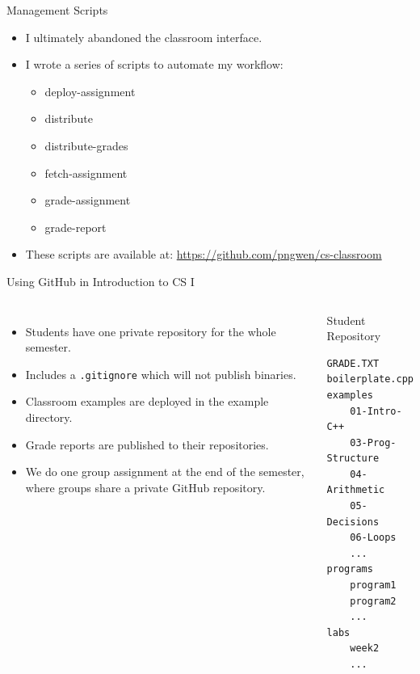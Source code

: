 \documentclass[handout]{beamer}
\begin{document}
\begin{frame}{Management Scripts}
    \begin{itemize}
        \item I ultimately abandoned the classroom interface.
        \item I wrote a series of scripts to automate my workflow:
        \begin{itemize}
            \item deploy-assignment
            \item distribute
            \item distribute-grades
            \item fetch-assignment
            \item grade-assignment
            \item grade-report
        \end{itemize}
        \item These scripts are available at: 
        \newline\url{https://github.com/pngwen/cs-classroom}
    \end{itemize}
\end{frame}

\begin{frame}[fragile]{Using GitHub in Introduction to CS I}

    \begin{columns}
    \begin{itemize}
        \item Students have one private repository for the whole semester.
        \item Includes a \texttt{.gitignore} which will not publish
            binaries.
        \item Classroom examples are deployed in the example
            directory.
        \item Grade reports are published to their repositories.
        \item We do one group assignment at the end of the semester,
            where groups share a private GitHub repository.
    \end{itemize}

    \begin{block}{Student Repository}
    \begin{adjustbox}{max totalheight=0.8\textheight}
    \begin{BVerbatim}
GRADE.TXT
boilerplate.cpp
examples
    01-Intro-C++
    03-Prog-Structure
    04-Arithmetic
    05-Decisions
    06-Loops
    ...
programs
    program1
    program2
    ...
labs
    week2
    ...
    \end{BVerbatim}
    \end{adjustbox}
    \end{block}
    \end{columns}
\end{frame}
\end{document}
